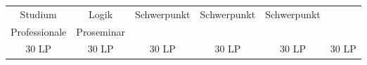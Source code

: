 \begin{table}[htbp]
{\begin{tabular}{|cccccc|}
			\multicolumn{1}{|c|}{Studium}      	   & \multicolumn{1}{c|}{Logik}            & \multicolumn{1}{c|}{Schwerpunkt}      & \multicolumn{1}{c|}{Schwerpunkt}   & \multicolumn{1}{c|}{Schwerpunkt}      &                \\ \cline{2-2} \cline{5-5}
			\multicolumn{1}{|c|}{Professionale}    & \multicolumn{1}{c|}{Proseminar}       & \multicolumn{1}{c|}{}                 & \multicolumn{1}{c|}{}              & \multicolumn{1}{c|}{}					&                \\ \hline
			30 LP                                  & 30 LP                                 & 30 LP                                 & 30 LP                              & 30 LP                                 & 30 LP          \\ \hline
		\end{tabular}}
\end{table}

